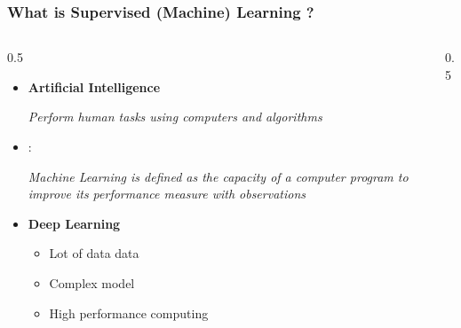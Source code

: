 \documentclass[pressentation,10pt,aspectratio=169,xcolor=table, colorlinks=true]{beamer}
\begin{document}
\begin{frame}
  \frametitle{What is Supervised (Machine) Learning ?}
  \begin{columns}[t]
    \begin{column}{0.5\linewidth}
      \begin{itemize}
      \item <1-> \textbf{Artificial Intelligence}
        \centerline{\em Perform human tasks using computers and algorithms}
      \item <2-> \cite{mitchelllearning}:
        \begin{center}
          \emph{Machine Learning is defined as the capacity of a computer program to improve its performance measure with observations}
        \end{center}
      \item <3-> \textbf{Deep Learning}
        \begin{itemize}
        \item Lot of data data
        \item Complex model
        \item High performance computing
        \end{itemize}
      \end{itemize}
    \end{column}

    \begin{column}{0.5\linewidth}
      \begin{center}
      \end{center}
    \end{column}
  \end{columns}
\end{frame}
\end{document}
